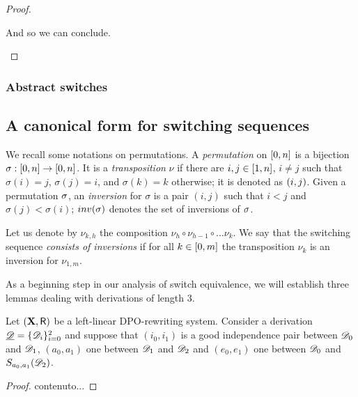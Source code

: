 \begin{proof}
\begin{enumerate}
		And so we can conclude.  \qedhere 
	\end{enumerate}
\end{proof}






\subsubsection{Abstract switches}



\subsection{A canonical form for switching sequences} 


We  recall some notations on permutations.  A \emph{permutation} on
$\interval[0]{n}$ is a bijection
$\sigma : \interval[0]{n} \to \interval[0]{n}$. It is a
\emph{transposition} $\nu$ if there are $i, j \in \interval{n}$,
$i \neq j$ such that $\sigma(i)=j$, $\sigma(j) = i$, and
$\sigma(k) = k$ otherwise; it is denoted as $\transp{i}[j]$. Given a permutation $\perm$, 
an \emph{inversion} for $\sigma$ is a pair $(i,j)$ such that $i<j$ and
$\sigma(j)< \sigma(i)$; $\inv{\sigma}$ denotes the set of
inversions of $\perm$.


Let us denote by $\nu_{k,h}$ the composition
$\nu_h \circ \nu_{h-1} \circ \ldots \nu_k$. We say that the
switching sequence \emph{consists of inversions} if for all
$k \in \interval[0]{m}$ the transposition $\nu_k$ is an inversion
for $\nu_{1,m}$.





As a beginning step in our analysis of switch equivalence, we will establish three lemmas  dealing with derivations of length $3$. 


\begin{lemma}\label{lem:primo}
Let $(\X,\R)$ be a left-linear DPO-rewriting system. Consider a derivation $\der{D}=\{\dder{D}_i\}_{i=0}^2$ and suppose that $(i_0,i_1)$ is a good independence pair between $\dder{D}_0$ and $\dder{D}_1$, $(a_0,a_1)$ one between $\dder{D}_1$ and $\dder{D}_2$ and $(e_0, e_1)$ one between $\dder{D}_0$ and $S_{a_0,a_1}(\dder{D}_2)$.
\end{lemma}
\begin{proof}
	contenuto...
\end{proof}


